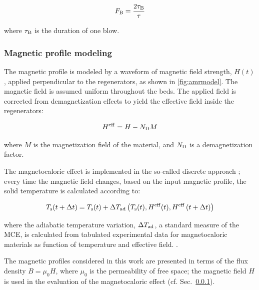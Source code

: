 \documentclass[referee]{svjour3}
\begin{document}
\begin{equation}
\label{eq:59}
F_{\mathrm{B}} = \frac{2\tau_{\mathrm{B}}}{\tau}
\end{equation}

\noindent where $\tau_{\mathrm{B}}$ is the duration of one blow.


\subsubsection{Magnetic profile modeling}
\label{sec:how-magnetic-profile}

The magnetic profile is modeled by a waveform of magnetic field strength, $H(t)$, applied perpendicular to the regenerators, as shown in \autoref{fig:amrmodel}. The magnetic field is assumed uniform throughout the beds. The applied field is corrected from demagnetization effects to yield the effective field inside the regenerators:

\begin{equation}
  \label{eq:6}
  H^{\mathrm{eff}} = H - N_{\mathrm{D}} M
\end{equation}


\noindent where $M$ is the magnetization field of the material, and $N_{\mathrm{D}}$ is a demagnetization factor.

The magnetocaloric effect is implemented in the so-called discrete approach \cite{bib:nielsen11_review}; every time the magnetic field changes, based on the input magnetic profile, the solid temperature is calculated according to:

\begin{equation}
  \label{eq:89}
  T_{\mathrm{s}}(t + \Delta{}t) = T_{\mathrm{s}}(t) + \Delta{}T_{\mathrm{ad}} \left(T_{\mathrm{s}}(t),H^{\mathrm{eff}}(t),H^{\mathrm{eff}}\left(t + \Delta{}t\right)\right)
\end{equation}



\noindent where the adiabatic temperature variation, $\Delta{}T_{\mathrm{ad}}$, a standard measure of the MCE, is calculated from tabulated experimental data for magnetocaloric materials as function of temperature and effective field. \cite{bib:trevizoli16_perfor_model}.

The magnetic profiles considered in this work are presented in terms of the flux density $B = \mu_0 H$, where $\mu_0$ is the permeability of free space; the magnetic field $H$ is used in the evaluation of the magnetocaloric effect (cf. Sec.~\ref{sec:how-magnetic-profile}).
\end{document}
